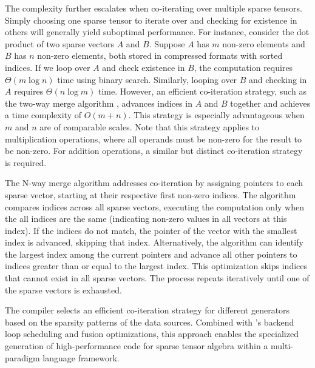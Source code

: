 \documentclass[acmsmall,nonacm]{acmart}\settopmatter{printfolios=true,printccs=false,printacmref=false}
\newcommand{\rhyme}{\text{Rhyme}\xspace}
\begin{document}
The complexity further escalates when co-iterating over multiple sparse tensors. Simply choosing one sparse tensor to iterate over and checking for existence in others will generally yield suboptimal performance. For instance, consider the dot product of two sparse vectors $A$ and $B$. Suppose $A$ has $m$ non-zero elements and $B$ has $n$ non-zero elements, both stored in compressed formats with sorted indices. If we loop over $A$ and check existence in $B$, the computation requires $\Theta(m\log{}n)$ time using binary search. Similarly, looping over $B$ and checking in $A$ requires $\Theta(n\log{}m)$ time. However, an efficient co-iteration strategy, such as the two-way merge algorithm \cite{knuth}, advances indices in $A$ and $B$ together and achieves a time complexity of $O(m + n)$. This strategy is especially advantageous when $m$ and $n$ are of comparable scales. Note that this strategy applies to multiplication operations, where all operands must be non-zero for the result to be non-zero. For addition operations, a similar but distinct co-iteration strategy is required.\par
The N-way merge algorithm addresses co-iteration by assigning pointers to each sparse vector, starting at their respective first non-zero indices. The algorithm compares indices across all sparse vectors, executing the computation only when the all indices are the same (indicating non-zero values in all vectors at this index). If the indices do not match, the pointer of the vector with the smallest index is advanced, skipping that index. Alternatively, the algorithm can identify the largest index among the current pointers and advance all other pointers to indices greater than or equal to the largest index. This optimization skips indices that cannot exist in all sparse vectors. The process repeats iteratively until one of the sparse vectors is exhausted.\par
The \rhyme compiler selects an efficient co-iteration strategy for different generators based on the sparsity patterns of the data sources. Combined with \rhyme's backend loop scheduling and fusion optimizations, this approach enables the specialized generation of high-performance code for sparse tensor algebra within a multi-paradigm language framework.
\end{document}
